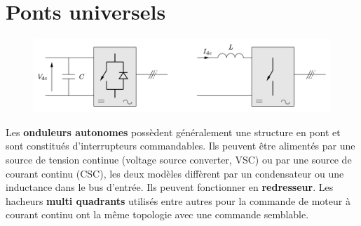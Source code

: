
\chapter{Ponts universels}
	\begin{figure}
	\vspace{-5mm}
	\includegraphics[scale=0.2]{ch4/1}
	\end{figure}
	Les \textbf{onduleurs autonomes} possèdent généralement une structure en pont et sont constitués d'interrupteurs commandables. Ils peuvent être alimentés par une source de tension continue (voltage source converter, VSC) ou par une source de courant continu (CSC), les deux modèles diffèrent par un condensateur ou une inductance dans le bus d'entrée. Ils peuvent fonctionner en \textbf{redresseur}. Les hacheurs \textbf{multi quadrants} utilisés entre autres pour la commande de moteur à courant continu ont la même topologie avec une commande semblable. 
	

